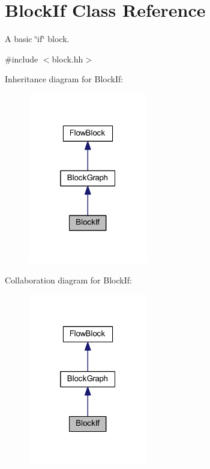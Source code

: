 \hypertarget{class_block_if}{}\section{Block\+If Class Reference}
\label{class_block_if}


A basic \char`\"{}if\char`\"{} block.  




{\ttfamily \#include $<$block.\+hh$>$}



Inheritance diagram for Block\+If\+:
\nopagebreak
\begin{figure}[H]
\begin{center}
\leavevmode
\includegraphics[width=148pt]{class_block_if__inherit__graph}
\end{center}
\end{figure}


Collaboration diagram for Block\+If\+:
\nopagebreak
\begin{figure}[H]
\begin{center}
\leavevmode
\includegraphics[width=148pt]{class_block_if__coll__graph}
\end{center}
\end{figure}
